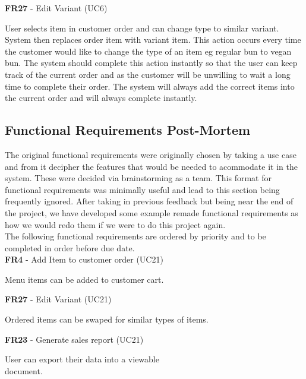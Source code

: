 \noindent \textbf{FR27} - Edit Variant (UC6)\\
\begin{small}
	User selects item in customer order and can change type to similar variant. System then replaces order item with variant item. This action occurs every time the customer would like to change the type of an item eg regular bun to vegan bun. The system should complete this action instantly so that the user can keep track of the current order and as the customer will be unwilling to wait a long time to complete their order. The system will always add the correct items into the current order and will always complete instantly.\\
\end{small}
\linebreak

\subsection{Functional Requirements Post-Mortem}
The original functional requirements were originally chosen by taking a use case and from it decipher the features that would be needed to acommodate it in the system. These were decided via brainstorming as a team.
This format for functional requirements was minimally useful and lead to this section being frequently ignored. After taking in previous feedback but being near the end of the project, we have developed some example remade functional requirements as
how we would redo them if we were to do this project again. \\
\linebreak
The following functional requirements are ordered by priority and to be completed in order before due date.\\

\noindent \textbf{FR4} - Add Item to customer order (UC21)\\
\begin{small}
	Menu items can be added to customer cart.\\
\end{small}

\noindent \textbf{FR27} - Edit Variant (UC21)\\
\begin{small}
	Ordered items can be swaped for similar types of items.\\
\end{small}

\noindent \textbf{FR23} - Generate sales report (UC21)\\
\begin{small}
	User can export their data into a viewable \\ document.
\end{small}
